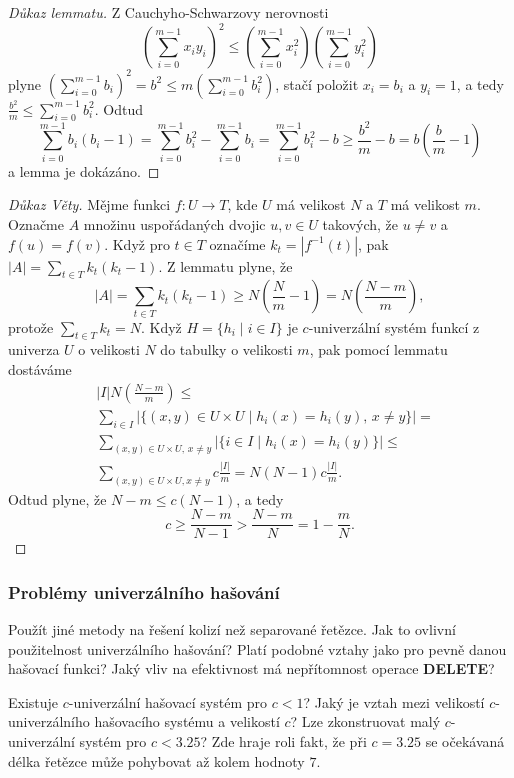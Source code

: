 \documentclass[a4paper,12pt]{article}
\begin{document}
\begin{proof}[Důkaz lemmatu]Z Cauchyho-Schwarzovy nerovnosti 
$$(\sum_{i=0}^{m-1}x_iy_i)^2\le (\sum_{i=0}^{m-1}x^2_i)(\sum_{i=0}^{
m-1}y_i^2)$$
plyne $(\sum_{i=0}^{m-1}b_i)^2=b^2\le m(\sum_{i=0}^{m-1}b_i^2)$, stačí položit 
$x_i=b_i$ a $y_i=1$, a tedy $\frac {b^2}m\le\sum_{i=0}^{m-1}b_i^2$. Odtud
$$\sum_{i=0}^{m-1}b_i(b_i-1)=\sum_{i=0}^{m-1}b_i^2-\sum_{i=0}^{m-
1}b_i=\sum_{i=0}^{m-1}b_i^2-b\ge\frac {b^2}m-b=b(\frac bm-1)$$
a lemma je dokázáno.
\end{proof}

\begin{proof}[Důkaz Věty]Mějme funkci $f:U\to T$, kde $U$ má 
velikost $N$ a $T$ má velikost $m$. Označme $A$ množinu 
uspořádaných dvojic $u,v\in U$ takových, že $u\ne v$ a $
f(u)=f(v)$.
Když pro $t\in T$ označíme $k_t=|f^{-1}(t)|$, pak $|A|=
\sum_{t\in T}k_t(k_t-1)$.
Z lemmatu plyne, že 
$$|A|=\sum_{t\in T}k_t(k_t-1)\ge N(\frac Nm-1)=N(\frac {N-m}m),$$
protože $\sum_{t\in T}k_t=N$.\newline 
Když $H=\{h_i\mid i\in I\}$ je $c$-univerzální systém funkcí z univerza $
U$ o 
velikosti $N$ do tabulky o velikosti $m$, pak pomocí 
lemmatu dostáváme 
\begin{align*}&|I|N(\frac {N-m}m)\le\\
&\sum_{i\in I}|\{(x,y)\in U\times U\mid h_i(x)=h_i(y),\,x\ne y\}|
=\\
&\sum_{(x,y)\in U\times U,\,x\ne y}|\{i\in I\mid h_i(x)=h_i(y)\}|
\le\\
&\sum_{(x,y)\in U\times U,x\ne y}c\frac {|I|}m=N(N-1)c\frac {|I|}
m.\end{align*}
Odtud plyne, že $N-m\le c(N-1)$, a tedy 
$$c\ge\frac {N-m}{N-1}>\frac {N-m}N=1-\frac mN.$$
\end{proof}

\subsubsection{Problémy univerzálního hašování}

Použít jiné metody na řešení kolizí než 
separované řetězce. Jak to ovlivní použitelnost 
univerzálního hašování? Platí podobné vztahy jako pro 
pevně danou hašovací funkci? Jaký vliv na efektivnost 
má nepřítomnost operace {\bf DELETE}?

Existuje $c$-univerzální hašovací systém pro 
$c<1$? Jaký je vztah mezi velikostí $c$-univerzální\-ho 
hašovacího systému a velikostí $c$? Lze zkonstruovat 
malý $c$-univerzální systém pro $c<3.25$? Zde hraje roli 
fakt, že při $c=3.25$ se očekávaná délka řetězce 
může pohybovat až kolem hodnoty $7$.
\end{document}
